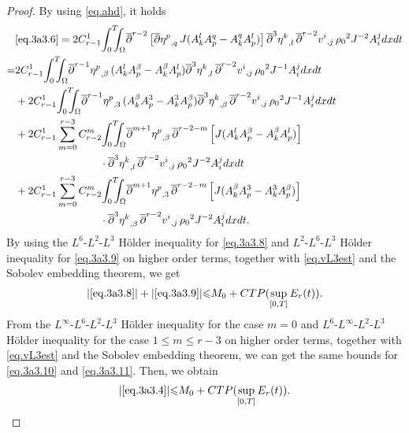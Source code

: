\documentclass[12pt,twoside,reqno]{amsart}
\numberwithin{equation}{section}
\theoremstyle{definition}
\theoremstyle{remark}
\begin{document}
\begin{proof}
By using \eqref{eq.ahd}, it holds
\begin{align}
  &\eqref{eq.3a3.6}
  = 2C_{r-1}^1{\int_0^T\!\!\!\!\int_\Omega }{\overline{\partial}}^{r-2}\left[ {{{{\overline{\partial}}\eta^p}}_{,{q}}\,} J(A^l_kA^q_p-A^q_kA^l_p)\right] {{{{\overline{\partial}}^3\eta^k}}_{,{l}}\,}{{{{\overline{\partial}}^{r-2} v^i}}_{,{j}}\,}{\rho_0}^2 J^{-2}A^j_i dxdt{\nonumber}\\
  =&2C_{r-1}^1{\int_0^T\!\!\!\!\int_\Omega }  {{{{\overline{\partial}}^{r-1}\eta^p}}_{,{\beta}}\,} (A^l_kA^\beta_p-A^\beta_kA^l_p) {{{{\overline{\partial}}^3\eta^k}}_{,{l}}\,}{{{{\overline{\partial}}^{r-2} v^i}}_{,{j}}\,}{\rho_0}^2 J^{-1}A^j_i dxdt\label{eq.3a3.8}\\
  &+2C_{r-1}^1{\int_0^T\!\!\!\!\int_\Omega }  {{{{\overline{\partial}}^{r-1}\eta^p}}_{,{3}}\,} (A^\beta_kA^3_p-A^3_kA^\beta_p) {{{{\overline{\partial}}^3\eta^k}}_{,{\beta}}\,}{{{{\overline{\partial}}^{r-2} v^i}}_{,{j}}\,}{\rho_0}^2 J^{-1}A^j_i dxdt\label{eq.3a3.9}\\
  &+2C_{r-1}^1\sum_{m=0}^{r-3}C_{r-2}^m{\int_0^T\!\!\!\!\int_\Omega } {{{{\overline{\partial}}^{m+1}\eta^p}}_{,{\beta}}\,} {\overline{\partial}}^{r-2-m}\left[J(A^l_kA^\beta_p-A^\beta_kA^l_p)\right]\label{eq.3a3.10}\\
  &\qquad\qquad\qquad\qquad \cdot{{{{\overline{\partial}}^3\eta^k}}_{,{l}}\,}{{{{\overline{\partial}}^{r-2} v^i}}_{,{j}}\,}{\rho_0}^2 J^{-2}A^j_i dxdt{\nonumber}\\
  &+2C_{r-1}^1\sum_{m=0}^{r-3}C_{r-2}^m{\int_0^T\!\!\!\!\int_\Omega } {{{{\overline{\partial}}^{m+1}\eta^p}}_{,{3}}\,} {\overline{\partial}}^{r-2-m}\left[J(A^\beta_kA^3_p-A^3_kA^\beta_p)\right]\label{eq.3a3.11}\\
  &\qquad\qquad\qquad\qquad \cdot {{{{\overline{\partial}}^3\eta^k}}_{,{\beta}}\,}{{{{\overline{\partial}}^{r-2} v^i}}_{,{j}}\,}{\rho_0}^2 J^{-2}A^j_i dxdt.{\nonumber}
\end{align}
By using the $L^6$-$L^2$-$L^3$ H\"older inequality for \eqref{eq.3a3.8} and $L^2$-$L^6$-$L^3$ H\"older inequality for \eqref{eq.3a3.9} on higher order terms, together with \eqref{eq.vL3est} and the Sobolev embedding theorem, we get
\begin{align*}
  {\vert{\eqref{eq.3a3.8}}\vert}+{\vert{\eqref{eq.3a3.9}}\vert}{\leqslant} M_0 +CTP(\sup_{[0,T]}E_r(t)).
\end{align*}
From the $L^\infty$-$L^6$-$L^2$-$L^3$ H\"older inequality for the case $m=0$ and $L^6$-$L^\infty$-$L^2$-$L^3$ H\"older inequality for the case $1{\leqslant} m{\leqslant} r-3$ on higher order terms, together with \eqref{eq.vL3est} and the Sobolev embedding theorem, we can get the same bounds for \eqref{eq.3a3.10} and \eqref{eq.3a3.11}. Then, we obtain
\begin{align*}
  {\vert{\eqref{eq.3a3.4}}\vert}{\leqslant} M_0+CTP(\sup_{[0,T]}E_r(t)).
\end{align*}


\end{proof}
\end{document}
